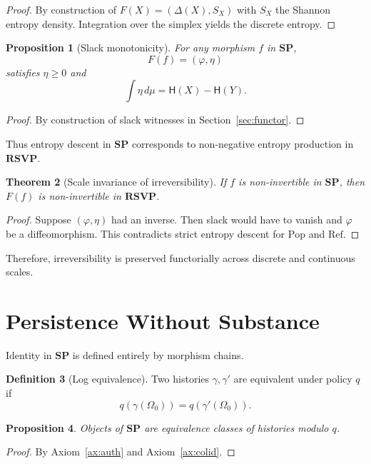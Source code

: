 \documentclass[12pt,a4paper]{article}
\newtheorem{theorem}{Theorem}[section]
\newtheorem{proposition}[theorem]{Proposition}
\theoremstyle{definition}
\newtheorem{definition}[theorem]{Definition}
\theoremstyle{remark}
\newcommand{\Ent}{\mathsf{H}}
\newcommand{\SP}{\mathbf{SP}}
\newcommand{\RSVP}{\mathbf{RSVP}}
\newcommand{\Pop}{\mathrm{Pop}}
\newcommand{\Ref}{\mathrm{Ref}}
\begin{document}
\begin{proof}
By construction of $F(X) = (\Delta(X),S_X)$ with $S_X$ the Shannon entropy density.
Integration over the simplex yields the discrete entropy.
\end{proof}

\begin{proposition}[Slack monotonicity]
For any morphism $f$ in $\SP$,
\[
  F(f) = (\varphi,\eta)
\]
satisfies $\eta \ge 0$ and
\[
  \int \eta \, d\mu = \Ent(X) - \Ent(Y).
\]
\end{proposition}

\begin{proof}
By construction of slack witnesses in Section~\ref{sec:functor}.
\end{proof}

Thus entropy descent in $\SP$ corresponds to non-negative entropy
production in $\RSVP$.

\begin{theorem}[Scale invariance of irreversibility]
If $f$ is non-invertible in $\SP$, then $F(f)$ is non-invertible in
$\RSVP$.
\end{theorem}

\begin{proof}
Suppose $(\varphi,\eta)$ had an inverse. Then slack would have to vanish
and $\varphi$ be a diffeomorphism. This contradicts strict entropy
descent for $\Pop$ and $\Ref$.
\end{proof}

Therefore, irreversibility is preserved functorially across discrete
and continuous scales.

\section{Persistence Without Substance}
\label{sec:persistence}

Identity in $\SP$ is defined entirely by morphism chains.

\begin{definition}[Log equivalence]
Two histories $\gamma,\gamma'$ are equivalent under policy $q$ if
\[
  q(\gamma(\Omega_0)) = q(\gamma'(\Omega_0)).
\]
\end{definition}

\begin{proposition}
Objects of $\SP$ are equivalence classes of histories modulo $q$.
\end{proposition}

\begin{proof}
By Axiom~\ref{ax:auth} and Axiom~\ref{ax:colid}.
\end{proof}
\end{document}

